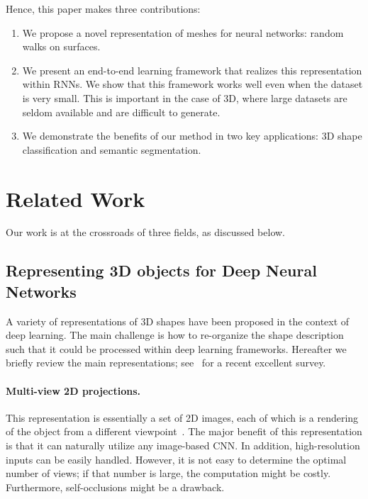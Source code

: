 \documentclass[acmtog]{acmart}
\begin{document}
Hence, this paper makes three contributions:
\begin{enumerate}
    \item 
    We propose a novel representation of meshes for neural networks: random walks on surfaces.
    \item
    We present an end-to-end learning framework that realizes this representation within RNNs.
    We show that this framework works well even when the dataset is very small.
    This is important in the case of 3D, where large datasets are seldom available and are difficult to generate.
    \item 
    We demonstrate the benefits of our method in two key applications: 3D shape classification and semantic segmentation.
\end{enumerate}

\section{Related Work}
\label{sec:relatedwork}
Our work is at the crossroads of three fields, as discussed below.

\subsection{Representing 3D objects for Deep Neural Networks}
\label{subsec:related_work_3d_representations}
A variety of representations of 3D shapes have been proposed in the context of deep learning.
The main challenge is how to re-organize the shape description such that it could be processed within deep learning frameworks. 
Hereafter we briefly review the main representations;
see~\cite{gezawa2020review} for a recent excellent survey.
 
\paragraph{Multi-view 2D projections.}
This representation is essentially a set of 2D images, each of which is a rendering of the object from a different viewpoint~\cite{su2015multi, kalogerakis20173d, qi2016volumetric, sarkar2018learning, gomez2017lonchanet, johns2016pairwise, zanuttigh2017deep, bai2016gift, wang2019dominant, kanezaki2018rotationnet, feng2018gvcnn, he2018triplet, han20193d2seqviews}.
The major benefit of this representation is that it can naturally utilize any image-based CNN. 
In addition, high-resolution inputs can be easily handled. 
However,  it is not easy to determine the optimal number of views; if that number is large, the computation might be costly.
Furthermore, self-occlusions might be a drawback.
\end{document}
